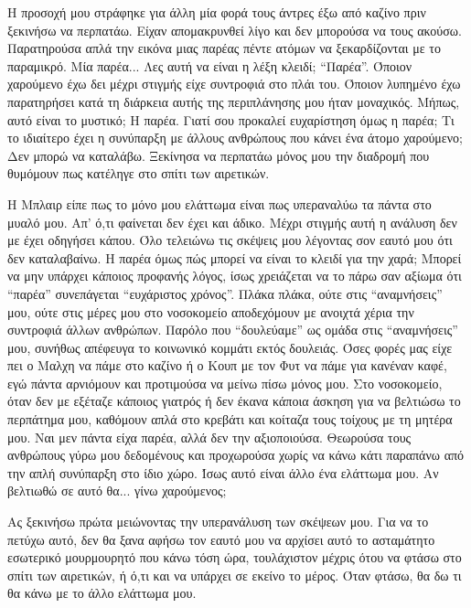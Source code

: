 \documentclass[12pt,twoside, openany]{book}
\begin{document}
Η προσοχή μου στράφηκε για άλλη μία φορά τους άντρες έξω από καζίνο πριν ξεκινήσω να περπατάω. Είχαν απομακρυνθεί λίγο και δεν μπορούσα να τους ακούσω. Παρατηρούσα απλά την εικόνα μιας παρέας πέντε ατόμων να ξεκαρδίζονται με το παραμικρό. Μία παρέα... Λες αυτή να είναι η λέξη κλειδί; “Παρέα”. Όποιον χαρούμενο έχω δει μέχρι στιγμής είχε συντροφιά στο πλάι του. Όποιον λυπημένο έχω παρατηρήσει κατά τη διάρκεια αυτής της περιπλάνησης μου ήταν μοναχικός. Μήπως, αυτό είναι το μυστικό; Η παρέα. Γιατί σου προκαλεί ευχαρίστηση όμως η παρέα; Τι το ιδιαίτερο έχει η συνύπαρξη με άλλους ανθρώπους που κάνει ένα άτομο χαρούμενο; Δεν μπορώ να καταλάβω. Ξεκίνησα να περπατάω μόνος μου την διαδρομή που θυμόμουν πως κατέληγε στο σπίτι των αιρετικών.

Η Μπλαιρ είπε πως το μόνο μου ελάττωμα είναι πως υπεραναλύω τα πάντα στο μυαλό μου. Απ’ ό,τι φαίνεται δεν έχει και άδικο. Μέχρι στιγμής αυτή η ανάλυση δεν με έχει οδηγήσει κάπου. Όλο τελειώνω τις σκέψεις μου λέγοντας σον εαυτό μου ότι δεν καταλαβαίνω. Η παρέα όμως πώς μπορεί να είναι το κλειδί για την χαρά; Μπορεί να μην υπάρχει κάποιος προφανής λόγος, ίσως χρειάζεται να το πάρω σαν αξίωμα ότι “παρέα” συνεπάγεται “ευχάριστος χρόνος”. Πλάκα πλάκα, ούτε στις “αναμνήσεις” μου, ούτε στις μέρες μου στο νοσοκομείο αποδεχόμουν με ανοιχτά χέρια την συντροφιά άλλων ανθρώπων. Παρόλο που “δουλεύαμε” ως ομάδα στις “αναμνήσεις” μου, συνήθως απέφευγα το κοινωνικό κομμάτι εκτός δουλειάς. Όσες φορές μας είχε πει ο Μαλχη να πάμε στο καζίνο ή ο Κουπ με τον Φυτ να πάμε για κανέναν καφέ, εγώ πάντα αρνιόμουν και προτιμούσα να μείνω πίσω μόνος μου. Στο νοσοκομείο, όταν δεν με εξέταζε κάποιος γιατρός ή δεν έκανα κάποια άσκηση για να βελτιώσω το περπάτημα μου, καθόμουν απλά στο κρεβάτι και κοίταζα τους τοίχους με τη μητέρα μου. Ναι μεν πάντα είχα παρέα, αλλά δεν την αξιοποιούσα. Θεωρούσα τους ανθρώπους γύρω μου δεδομένους και προχωρούσα χωρίς να κάνω κάτι παραπάνω από την απλή συνύπαρξη στο ίδιο χώρο. Ίσως αυτό είναι άλλο ένα ελάττωμα μου. Αν βελτιωθώ σε αυτό θα... γίνω χαρούμενος;

Ας ξεκινήσω πρώτα μειώνοντας την υπερανάλυση των σκέψεων μου. Για να το πετύχω αυτό, δεν θα ξανα αφήσω τον εαυτό μου να αρχίσει αυτό το ασταμάτητο εσωτερικό μουρμουρητό που κάνω τόση ώρα, τουλάχιστον μέχρις ότου να φτάσω στο σπίτι των αιρετικών, ή ό,τι και να υπάρχει σε εκείνο το μέρος. Όταν φτάσω, θα δω τι θα κάνω με το άλλο ελάττωμα μου.

\chapter{}
\end{document}
